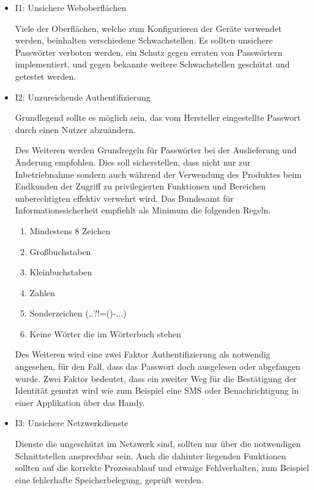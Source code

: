         \begin{itemize}
            \item I1: Unsichere Weboberflächen
            
            Viele der Oberflächen, welche zum Konfigurieren der Geräte verwendet werden, beinhalten verschiedene Schwachstellen.
            Es sollten unsichere Passwörter verboten werden, ein Schutz gegen erraten von Passwörtern implementiert, und gegen bekannte weitere Schwachstellen geschützt und getestet werden.
            
            \item I2: Unzureichende Authentifizierung
            
            Grundlegend sollte es möglich sein, das vom Hersteller eingestellte Passwort durch einen Nutzer abzuändern.
            
            Des Weiteren werden Grundregeln für Passwörter bei der Auslieferung und Änderung empfohlen. Dies soll sicherstellen, dass nicht nur zur Inbetriebnahme sondern auch während der Verwendung des Produktes beim Endkunden der Zugriff zu privilegierten Funktionen und Bereichen unberechtigten effektiv verwehrt wird. Das Bundesamt für Informationssicherheit \cite{bundesamt_fuer_sicherheit_in_der_informationstechnik_2018} 
            empfiehlt als Minimum die folgenden Regeln.
            \begin{enumerate}
                \item Mindestens 8 Zeichen
                \item Großbuchstaben
                \item Kleinbuchstaben
                \item Zahlen
                \item Sonderzeichen (,.?!=()-...)
                \item Keine Wörter die im Wörterbuch stehen
            \end{enumerate}
            
            Des Weiteren wird eine zwei Faktor Authentifizierung als notwendig angesehen, für den Fall, dass das Passwort doch ausgelesen oder abgefangen wurde. Zwei Faktor bedeutet, dass ein zweiter Weg für die Bestätigung der Identität genutzt wird wie zum Beispiel eine SMS oder Benachrichtigung in einer Applikation über das Handy.
            
            \item I3: Unsichere Netzwerkdienste
            
            Dienste die ungeschützt im Netzwerk sind, sollten nur über die notwendigen Schnittstellen ansprechbar sein.
            Auch die dahinter liegenden Funktionen sollten auf die korrekte Prozessablauf und etwaige Fehlverhalten, zum Beispiel eine fehlerhafte Speicherbelegung, geprüft werden.
            

\end{itemize}
